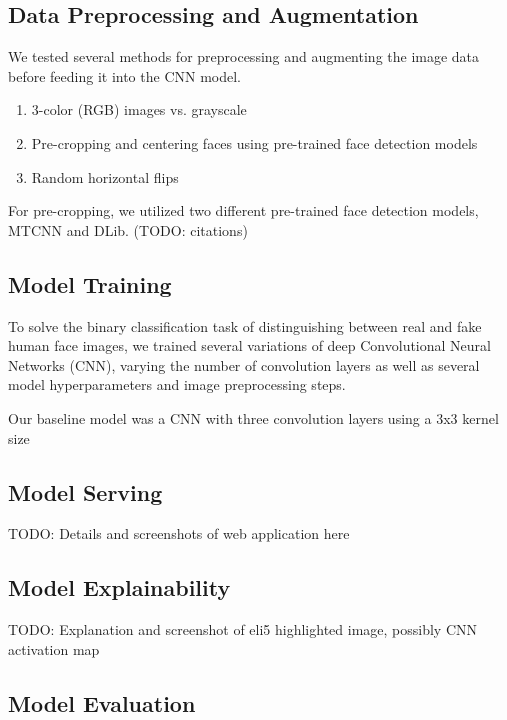 \documentclass[11pt, letterpaper]{article}
\begin{document}
\begin{multicols}{2}
  \subsection{Data Preprocessing and Augmentation}

  We tested several methods for preprocessing and augmenting the image data before
  feeding it into the CNN model.

  \begin{enumerate}
  \item 3-color (RGB) images vs. grayscale
  \item Pre-cropping and centering faces using pre-trained face detection models
  \item Random horizontal flips
  \end{enumerate}

  For pre-cropping, we utilized two different pre-trained face detection models,
  MTCNN and DLib. (TODO: citations)

  \subsection{Model Training}

  To solve the binary classification task of distinguishing between real and fake
  human face images, we trained several variations of deep Convolutional
  Neural Networks (CNN), varying the number of convolution layers as well as several
  model hyperparameters and image preprocessing steps.

  Our baseline model was a CNN with three convolution layers using a 3x3 kernel size

  \subsection{Model Serving}

  TODO: Details and screenshots of web application here

  \subsection{Model Explainability}

  TODO: Explanation and screenshot of eli5 highlighted image, possibly CNN activation map

  \subsection{Model Evaluation}


\end{multicols}
\end{document}
